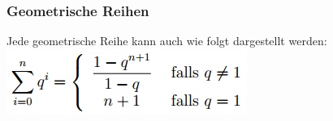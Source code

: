 \subsubsection{Geometrische Reihen}
Jede geometrische Reihe kann auch wie folgt dargestellt werden:\\
\includegraphics[width = 4.5 cm]{pictures/geometrischeReihen}\\
